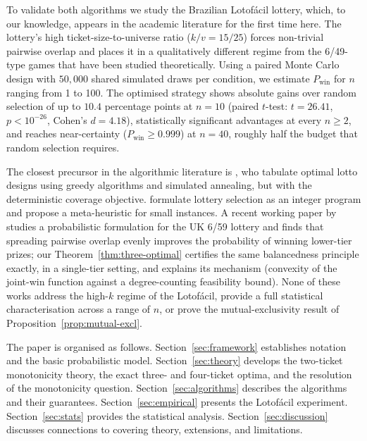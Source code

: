 To validate both algorithms we study the Brazilian Lotof\'{a}cil lottery,
which, to our knowledge, appears in the academic literature for the first
time here.  The lottery's high ticket-size-to-universe ratio ($k/v = 15/25$)
forces non-trivial pairwise overlap and places it in a qualitatively
different regime from the 6/49-type games that have been studied theoretically.
Using a paired Monte Carlo design with $50{,}000$ shared simulated draws per
condition, we estimate $P_{\mathrm{win}}$ for $n$ ranging from 1 to 100.
The optimised strategy shows absolute gains over random selection of up to
$10.4$ percentage points at $n=10$ (paired $t$-test: $t = 26.41$,
$p < 10^{-26}$, Cohen's $d = 4.18$), statistically significant advantages
at every $n \ge 2$, and reaches near-certainty ($P_{\mathrm{win}} \ge
0.999$) at $n = 40$, roughly half the budget that random selection
requires.

The closest precursor in the algorithmic literature is \citet{Li2002}, who
tabulate optimal lotto designs using greedy algorithms and simulated annealing,
but with the deterministic coverage objective.  \citet{Mohammadi2012} formulate
lottery selection as an integer program and propose a meta-heuristic for small
instances.  A recent working paper by \citet{Liu2024} studies a probabilistic
formulation for the UK 6/59 lottery and finds that spreading pairwise overlap
evenly improves the probability of winning lower-tier prizes; our
Theorem~\ref{thm:three-optimal} certifies the same balancedness principle
exactly, in a single-tier setting, and explains its mechanism (convexity of
the joint-win function against a degree-counting feasibility bound).
None of these works address the high-$k$ regime of the Lotof\'{a}cil, provide
a full statistical characterisation across a range of $n$, or prove the
mutual-exclusivity result of Proposition~\ref{prop:mutual-excl}.

The paper is organised as follows.  Section~\ref{sec:framework} establishes
notation and the basic probabilistic model.
Section~\ref{sec:theory} develops the two-ticket monotonicity theory, the
exact three- and four-ticket optima, and the resolution of the
monotonicity question.  Section~\ref{sec:algorithms} describes the
algorithms and their guarantees.  Section~\ref{sec:empirical} presents the Lotof\'{a}cil
experiment.  Section~\ref{sec:stats} provides the statistical analysis.
Section~\ref{sec:discussion} discusses connections to covering theory,
extensions, and limitations.
